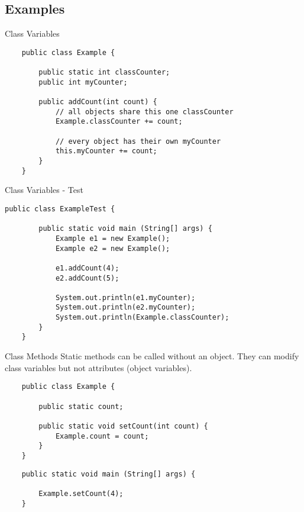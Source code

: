 \subsection{Examples}
\begin{frame}[fragile]{Class Variables}
    \begin{lstlisting}
    public class Example {
    
        public static int classCounter;
        public int myCounter;

        public addCount(int count) {
            // all objects share this one classCounter
            Example.classCounter += count;
            
            // every object has their own myCounter
            this.myCounter += count;
        }
    }\end{lstlisting}
\end{frame}

\begin{frame}[fragile]{Class Variables - Test}
    \begin{lstlisting}[basicstyle=\ttfamily\scriptsize]
    public class ExampleTest {
    
        public static void main (String[] args) {
            Example e1 = new Example();
            Example e2 = new Example();
            
            e1.addCount(4);
            e2.addCount(5);
            
            System.out.println(e1.myCounter);
            System.out.println(e2.myCounter);
            System.out.println(Example.classCounter);
        }
    }\end{lstlisting}
\end{frame}

\begin{frame}[fragile]{Class Methods}
    Static methods can be called without an object.
    They can modify class variables but not attributes (object variables).
    \begin{lstlisting}
    public class Example {
    
        public static count;

        public static void setCount(int count) {
            Example.count = count;
        }
    }\end{lstlisting}
    \begin{lstlisting}
    public static void main (String[] args) {
            
        Example.setCount(4);
    }\end{lstlisting}
\end{frame}

